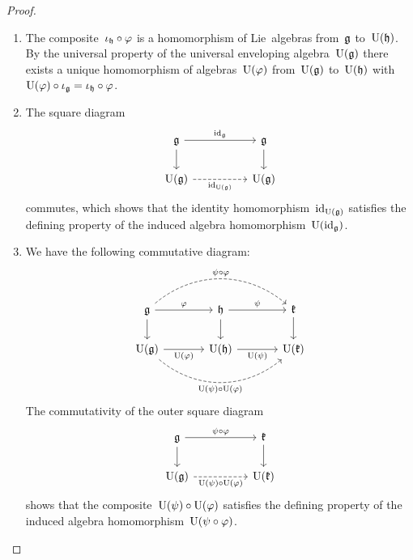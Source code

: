 \begin{proof}
	\leavevmode
	\begin{enumerate}
		\item
			The composite~$\iota_{\mathfrak{h}} \circ \varphi$ is a homomorphism of Lie~algebras from~$\mathfrak{g}$ to~$\operatorname{U}(\mathfrak{h})$.
			By the universal property of the universal enveloping algebra~$\operatorname{U}(\mathfrak{g})$ there exists a unique homomorphism of algebras~$\operatorname{U}(\varphi)$ from~$\operatorname{U}(\mathfrak{g})$ to~$\operatorname{U}(\mathfrak{h})$ with~$\operatorname{U}(\varphi) \circ \iota_{\mathfrak{g}} = \iota_{\mathfrak{h}} \circ \varphi$.
		\item
			The square diagram
			\[
				\begin{tikzcd}[column sep = huge]
					\glie
					\arrow{r}[above]{\id_{\glie}}
					\arrow{d}
					&
					\glie
					\arrow{d}
					\\
					\Univ(\glie)
					\arrow[dashed]{r}[below]{\id_{\Univ(\glie)}}
					&
					\Univ(\glie)
				\end{tikzcd}
			\]
			commutes, which shows that the identity homomorphism~$\mathrm{id}_{\operatorname{U}(\mathfrak{g})}$ satisfies the defining property of the induced algebra homomorphism~$\operatorname{U}( \mathrm{id}_{\mathfrak{g}} )$.
		\item
			We have the following commutative diagram:
			\[
				\begin{tikzcd}[column sep = large]
					\glie
					\arrow[dashed, bend left = 40]{rr}[above]{\psi \circ \varphi}
					\arrow{r}[above]{\varphi}
					\arrow{d}
					&
					\hlie
					\arrow{r}[above]{\psi}
					\arrow{d}
					&
					\klie
					\arrow{d}
					\\
					\Univ(\glie)
					\arrow{r}[below]{\Univ(\varphi)}
					\arrow[dashed, bend right = 40]{rr}[below]{\Univ(\psi) \circ \Univ(\varphi)}
					&
					\Univ(\hlie)
					\arrow{r}[below]{\Univ(\psi)}
					&
					\Univ(\klie)
				\end{tikzcd}
			\]
			The commutativity of the outer square diagram
			\[
				\begin{tikzcd}[column sep = huge]
					\glie
					\arrow{r}[above]{\psi \circ \varphi}
					\arrow{d}
					&
					\klie
					\arrow{d}
					\\
					\Univ(\glie)
					\arrow[dashed]{r}[below]{\Univ(\psi) \circ \Univ(\varphi)}
					&
					\Univ(\klie)
				\end{tikzcd}
			\]
			shows that the composite~$\operatorname{U}(\psi) \circ \operatorname{U}(\varphi)$ satisfies the defining property of the induced algebra homomorphism~$\operatorname{U}(\psi \circ \varphi)$.
		\qedhere
	\end{enumerate}
\end{proof}


